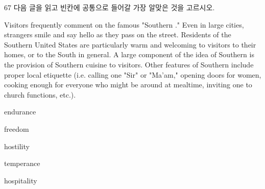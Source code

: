 \begin{question}{67}
다음 글을 읽고 빈칸에 공통으로 들어갈 가장 알맞은 것을 고르시오.
\begin{framedtext}
Visitors frequently comment on the famous "Southern \blank{}." Even in large cities, strangers smile and say hello as they pass on the street. Residents of the Southern United States are particularly warm and welcoming to visitors to their homes, or to the South in general. A large component of the idea of Southern \blank{} is the provision of Southern cuisine to visitors. Other features of Southern \blank{} include proper local etiquette (i.e. calling one "Sir" or "Ma'am," opening doors for women, cooking enough for everyone who might be around at mealtime, inviting one to church functions, etc.).
\end{framedtext}
\begin{choices}
  \item endurance
  \item freedom
  \item hostility
  \item temperance
  \item hospitality
\end{choices}
\end{question}
